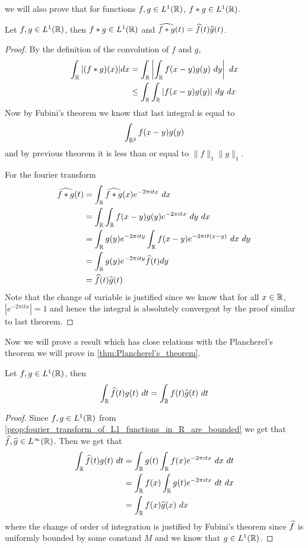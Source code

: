   we will also prove that for functions $f, g \in L^1(\mathbb R)$, $f*g \in L^1(\mathbb R)$.
  \begin{proposition}
    \label{prop:convolution_is_well_defined_in_L^1(R)}
    Let $f, g \in L^1(\mathbb R)$, then $f*g \in L^1(\mathbb R)$ and $\widehat{f*g}(t) = \widehat{f}(t)\widehat{g}(t)$.
  \end{proposition}
  \begin{proof}
    By the definition of the convolution of $f$ and $g$, 
    \begin{align*}
      \int_\mathbb R|(f*g)(x)| dx &= \int_\mathbb R \left| \int_\mathbb R f(x-y)g(y) \ dy \right| \ dx \\
      & \le \int_\mathbb R \int_\mathbb R |f(x-y)g(y)| \ dy \ dx
    \end{align*}
    Now by Fubini's theorem we know that last integral is equal to $$\int_{\mathbb R^2}f(x-y)g(y) $$ and by previous theorem it is less than or equal to $\|f\|_1\|g\|_1$.

    For the fourier transform
    \begin{align*}
      \widehat{f*g}(t) &= \int_\R \widehat{f*g}(x) e^{-2 \pi itx} \ dx \\
      &= \int_\R \int_\R f(x-y)g(y) e^{-2 \pi itx} \ dy \ dx \\
      &= \int_\R g(y)e^{-2 \pi ity}\int_\R f(x-y) e^{-2 \pi it (x-y)} \ dx \ dy \\
      &= \int_\R g(y)e^{-2 \pi ity} \hatf(t) dy \\
      &= \hatf(t) \hatg(t) \\
    \end{align*}
    Note that the change of variable is justified since we know that  for all $x \in \mathbb R$, $|e^{-2\pi itx}| = 1$ and hence the integral is absolutely convergent by the proof similar to last theorem. 
  \end{proof}

  Now we will prove a result which has close relations with the Plancherel's theorem we will prove in \autoref{thm:Plancherel's_theorem}. 
\begin{proposition}
  \label{prop:plancherel_theorem_in_L1}
  Let $f, g \in L^1(\mathbb R)$, then $$\int_\mathbb R \widehat{f}(t) g(t) \ dt = \int_\mathbb R f(t) \widehat{g}(t) \ dt$$
\end{proposition}
\begin{proof}
  Since $f, g \in L^1(\mathbb R)$ from \autoref{prop:fourier_transform_of_L1_functions_in_R_are_bounded} we get that $\widehat{f}, \widehat{g} \in L^\infty(\mathbb R)$. Then we get that 
  \begin{align*}
    \int_\mathbb R \widehat{f}(t) g(t) \ dt &= \int_\mathbb R g(t) \int_\mathbb R f(x) e^{-2\pi itx} \ dx \ dt \\
    & = \int_\mathbb R f(x) \int_\mathbb R g(t) e^{-2\pi itx} \ dt \ dx \\
    & = \int_\mathbb R f(x)\widehat{g}(x) \ dx
  \end{align*}
  where the change of order of integration is justified by Fubini's theorem since $\widehat{f}$ is uniformly bounded by some constand $M$ and we know that $g \in L^1(\mathbb R)$.
\end{proof}

